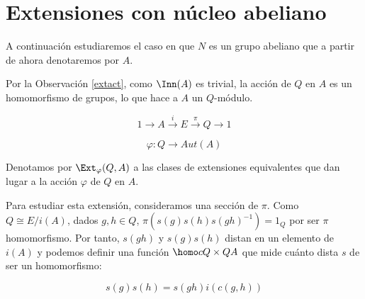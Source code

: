 
\section{Extensiones con núcleo abeliano}\label{sec:ab}
A continuación estudiaremos el caso en que $N$ es un grupo abeliano que a partir de ahora denotaremos por $A$. 
 
 Por la Observación \ref{extact}, como $\Inn(A)$ es trivial, la acción de $Q$ en $A$ es un homomorfismo de grupos, lo que hace a $A$ un $Q$-módulo.

\begin{equation}\label{exta}
	1\to A\xrightarrow{i} E\xrightarrow{\pi} Q\to 1
\end{equation}

\begin{equation}
	\varphi \colon Q \to Aut(A)
\end{equation}

\begin{definicion}
	Denotamos por $\Ext_\varphi(Q,A)$ a las clases de extensiones equivalentes que dan lugar a la acción $\varphi$ de $Q$ en $A$.
\end{definicion}

Para estudiar esta extensión, consideramos una sección de $\pi$. Como $Q\cong E/i(A)$, dados $g,h\in Q$, $\pi\left(s(g)s(h)s(gh)^{-1}\right) = 1_{Q}$ por ser $\pi$ homomorfismo. Por tanto, $s(gh)$ y $s(g)s(h)$ distan en un elemento de $i(A)$ y podemos definir una función $\homo c {Q\times Q} {A}$ que mide cuánto dista $s$ de ser un homomorfismo:

\begin{equation}
	s(g)s(h) = s(gh)i\left(c(g,h)\right)
\end{equation}

